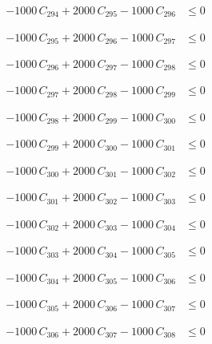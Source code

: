 \documentclass[a4paper,11pt]{article}
\begin{document}
\begin{align}
-1000\,C_{294} + 2000\,C_{295} - 1000\,C_{296} &\leq 0 \nonumber
\end{align}

\begin{align}
-1000\,C_{295} + 2000\,C_{296} - 1000\,C_{297} &\leq 0 \nonumber
\end{align}

\begin{align}
-1000\,C_{296} + 2000\,C_{297} - 1000\,C_{298} &\leq 0 \nonumber
\end{align}

\begin{align}
-1000\,C_{297} + 2000\,C_{298} - 1000\,C_{299} &\leq 0 \nonumber
\end{align}

\begin{align}
-1000\,C_{298} + 2000\,C_{299} - 1000\,C_{300} &\leq 0 \nonumber
\end{align}

\begin{align}
-1000\,C_{299} + 2000\,C_{300} - 1000\,C_{301} &\leq 0 \nonumber
\end{align}

\begin{align}
-1000\,C_{300} + 2000\,C_{301} - 1000\,C_{302} &\leq 0 \nonumber
\end{align}

\begin{align}
-1000\,C_{301} + 2000\,C_{302} - 1000\,C_{303} &\leq 0 \nonumber
\end{align}

\begin{align}
-1000\,C_{302} + 2000\,C_{303} - 1000\,C_{304} &\leq 0 \nonumber
\end{align}

\begin{align}
-1000\,C_{303} + 2000\,C_{304} - 1000\,C_{305} &\leq 0 \nonumber
\end{align}

\begin{align}
-1000\,C_{304} + 2000\,C_{305} - 1000\,C_{306} &\leq 0 \nonumber
\end{align}

\begin{align}
-1000\,C_{305} + 2000\,C_{306} - 1000\,C_{307} &\leq 0 \nonumber
\end{align}

\begin{align}
-1000\,C_{306} + 2000\,C_{307} - 1000\,C_{308} &\leq 0 \nonumber
\end{align}
\end{document}
